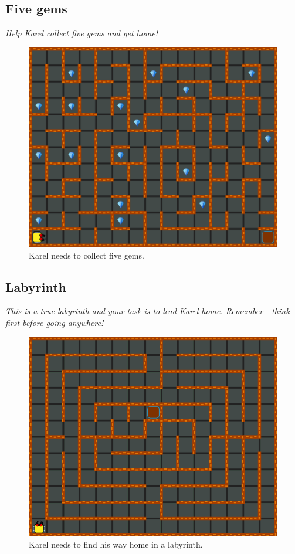 \subsection{Five gems}

{\em Help Karel collect five gems and get home!}\\[-7mm]

\begin{figure}[!ht]
\begin{center}
\includegraphics[height=0.4\textwidth]{img/a09.png}
\end{center}
\vspace{-4mm}
\caption{Karel needs to collect five gems.}
\label{fig:a09}
\vspace{-10mm}
\end{figure}
\noindent
\newpage

\subsection{Labyrinth}

{\em This is a true labyrinth and your task is to lead Karel 
home. Remember - think first before going anywhere!}

\begin{figure}[!ht]
\begin{center}
\includegraphics[height=0.4\textwidth]{img/a10.png}
\end{center}
\vspace{-4mm}
\caption{Karel needs to find his way home in a labyrinth.}
\label{fig:a10}
\vspace{-4mm}
\end{figure}
\noindent


